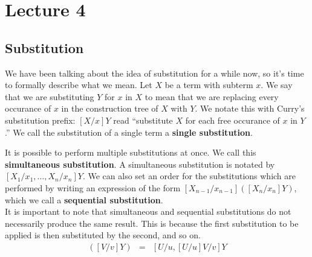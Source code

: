 \chapter{Lecture 4}

\section{Substitution}

We have been talking about the idea of substitution for a while now, so it's time to formally describe what we mean. Let $X$ be a term with subterm $x$. We say that we are substituting $Y$ for $x$ in $X$ to mean that we are replacing every occurance of $x$ in the construction tree of $X$ with $Y$. We notate this with Curry's substitution prefix: $[X / x]Y$ read ``substitute $X$ for each free occurance of $x$ in $Y$.'' We call the substitution of a single term a \textbf{single substitution}.\\


It is possible to perform multiple substitutions at once. We call this \textbf{simultaneous substitution}. A simultaneous substitution is notated by $[X_1/x_1,\ldots,X_n/x_n]Y$. We can also set an order for the substitutions which are performed by writing an expression of the form $[X_{n-1}/x_{n-1}]([X_n / x_n]Y)$, which we call a \textbf{sequential substitution}.\\

It is important to note that simultaneous and sequential substitutions do not necessarily produce the same result. This is because the first substitution to be applied is then substituted by the second, and so on.
\begin{eqnarray*}
  [U/u]([V/v]Y) &=& [U/u,[U/u]V/v]Y\\
\end{eqnarray*}

